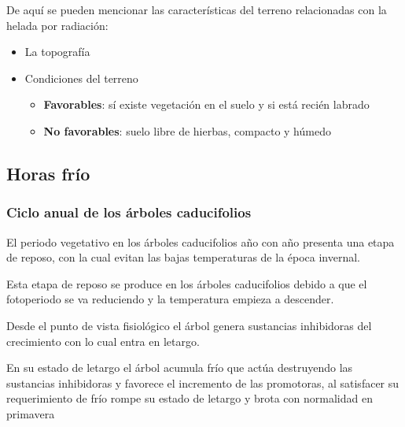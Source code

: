         De aquí se pueden mencionar las características del terreno relacionadas con la helada por radiación:
        \begin{itemize}
            \item La topografía
            \item Condiciones del terreno \begin{itemize}
                \item \textbf{Favorables}: sí existe vegetación en el suelo y si está recién labrado
                \item \textbf{No favorables}: suelo libre de hierbas, compacto y húmedo
            \end{itemize}
        \end{itemize}
        
        \subsection{Horas frío}
        \subsubsection{Ciclo anual de los árboles caducifolios}
        El periodo vegetativo en los árboles caducifolios año con
        año presenta una etapa de reposo, con la cual evitan las
        bajas temperaturas de la época invernal.
        
        Esta etapa de reposo se produce en los árboles caducifolios debido a que el fotoperiodo se va reduciendo y la temperatura empieza a descender.
        
        Desde el punto de vista fisiológico el árbol genera sustancias inhibidoras del crecimiento con lo cual entra en letargo.
        
        En su estado de letargo el árbol acumula frío que actúa destruyendo las sustancias inhibidoras y favorece el incremento de las promotoras, al satisfacer su requerimiento de frío rompe su estado de letargo y brota con normalidad en primavera
        
